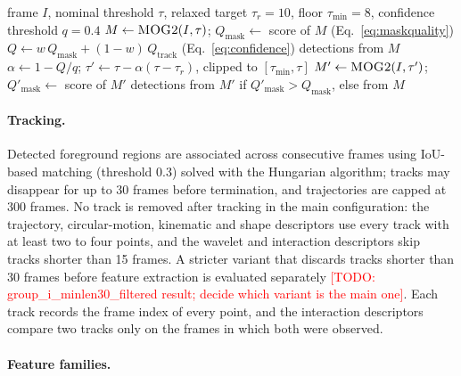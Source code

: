 \documentclass[runningheads]{llncs}
\newcommand{\todo}[1]{\textcolor{red}{[TODO: #1]}}
\begin{document}
\begin{algorithm}[htbp]
\small
\caption{Confidence-driven Adaptive MOG2 (per frame)}
\label{alg:adaptive}
\begin{algorithmic}[1]
\Require frame $I$, nominal threshold $\tau$, relaxed target $\tau_r=10$, floor $\tau_{\min}=8$, confidence threshold $q=0.4$
\State $M \gets \textsc{MOG2}(I, \tau)$; $Q_{\text{mask}} \gets$ score of $M$ (Eq.~\eqref{eq:maskquality})
\State $Q \gets w\,Q_{\text{mask}} + (1-w)\,Q_{\text{track}}$ (Eq.~\eqref{eq:confidence})
    \State \Return detections from $M$ 
\Else
    \State $\alpha \gets 1 - Q / q$; \; $\tau' \gets \tau - \alpha(\tau - \tau_r)$, clipped to $[\tau_{\min}, \tau]$
    \State $M' \gets \textsc{MOG2}(I, \tau')$; \; $Q'_{\text{mask}} \gets$ score of $M'$
    \State \Return detections from $M'$ if $Q'_{\text{mask}} > Q_{\text{mask}}$, else from $M$
\EndIf
\end{algorithmic}
\end{algorithm}

\paragraph{Tracking.}

Detected foreground regions are associated across consecutive frames using 
IoU-based matching (threshold 0.3) solved with the Hungarian algorithm; 
tracks may disappear for up to 30 frames before termination, and trajectories 
are capped at 300 frames. No track is removed after tracking in the main configuration: 
the trajectory, circular-motion, kinematic and shape descriptors use every track with at least 
two to four points, and the wavelet and interaction descriptors skip tracks shorter than 15 frames. 
A stricter variant that discards tracks shorter than 30 frames before feature extraction is evaluated 
separately \todo{group\_i\_minlen30\_filtered result; decide which variant is the main one}. 
Each track records the frame index of every point, and the interaction descriptors compare two 
tracks only on the frames in which both were observed.

\paragraph{Feature families.}
\end{document}
